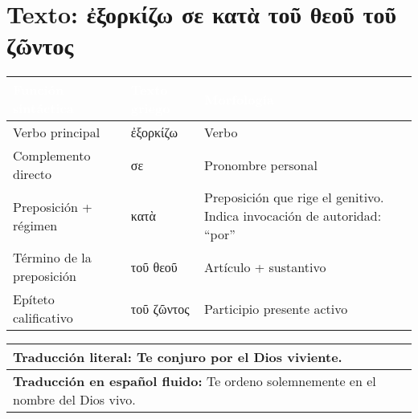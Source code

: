 \documentclass[a4paper,12pt]{article}
\begin{document}
\section{Texto: \textgreek{ἐξορκίζω σε κατὰ τοῦ θεοῦ τοῦ ζῶντος}}

\begin{tabularx}{\textwidth}{|Y|Y|Y|}
\hline
\textcolor{white}{\textbf{Función sintáctica}} & \textcolor{white}{\textbf{Texto griego}} & \textcolor{white}{\textbf{Morfología}} \\
\hline
\hline
Verbo principal & \textgreek{ἐξορκίζω} & Verbo \\
\hline
Complemento directo & \textgreek{σε} & Pronombre personal \\
\hline
Preposición + régimen & \textgreek{κατὰ} & Preposición que rige el genitivo. Indica invocación de autoridad: “por” \\
\hline
Término de la preposición & \textgreek{τοῦ θεοῦ} & Artículo + sustantivo \\
\hline
Epíteto calificativo & \textgreek{τοῦ ζῶντος} & Participio presente activo \\
\hline \end{tabularx}

\vspace{1cm}
\begin{tabularx}{\textwidth}{|Y|}
\hline
\textbf{Traducción literal:} Te conjuro por el Dios viviente. \\
\hline
\textbf{Traducción en español fluido:} Te ordeno solemnemente en el nombre del Dios vivo. \\
\hline
\end{tabularx}
\end{document}
